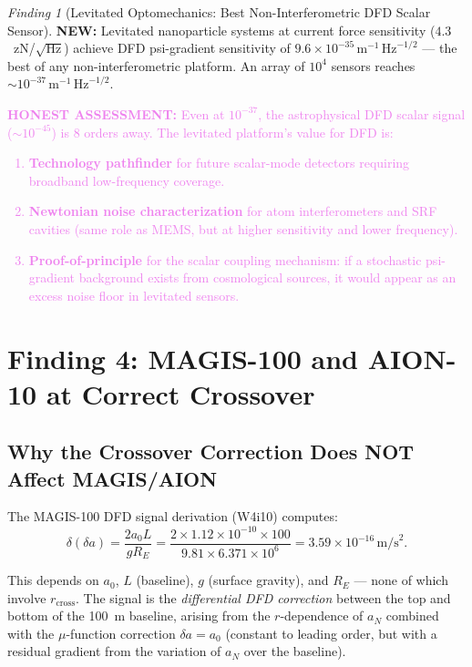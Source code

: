 \documentclass[11pt]{article}
\theoremstyle{definition}
\theoremstyle{remark}
\newtheorem{finding}[theorem]{Finding}
\newcommand{\ee}[1]{\times10^{#1}}
\newcommand{\sqrtHz}{\,\mathrm{Hz}^{-1/2}}
\newcommand{\azero}{a_0}
\newcommand{\honest}[1]{\textcolor{violet}{\textbf{HONEST ASSESSMENT:} #1}}
\newcommand{\newresult}[1]{\textcolor{green!50!black}{\textbf{NEW:} #1}}
\begin{document}
\begin{finding}[Levitated Optomechanics: Best Non-Interferometric
  DFD Scalar Sensor]
\label{find:levitated}
\newresult{Levitated nanoparticle systems at current force sensitivity
($4.3$~zN/$\sqrt{\mathrm{Hz}}$) achieve DFD psi-gradient sensitivity of
$9.6\ee{-35}\,\mathrm{m}^{-1}\sqrtHz$ --- the best of any
non-interferometric platform. An array of $10^4$ sensors reaches
$\sim 10^{-37}\,\mathrm{m}^{-1}\sqrtHz$.}

\honest{Even at $10^{-37}$, the astrophysical DFD scalar signal
($\sim 10^{-45}$) is 8 orders away. The levitated platform's value
for DFD is:
\begin{enumerate}[nosep]
\item \textbf{Technology pathfinder} for future scalar-mode
  detectors requiring broadband low-frequency coverage.
\item \textbf{Newtonian noise characterization} for atom
  interferometers and SRF cavities (same role as MEMS, but
  at higher sensitivity and lower frequency).
\item \textbf{Proof-of-principle} for the scalar coupling
  mechanism: if a stochastic psi-gradient background exists
  from cosmological sources, it would appear as an excess
  noise floor in levitated sensors.
\end{enumerate}}
\end{finding}

\section{Finding 4: MAGIS-100 and AION-10 at Correct Crossover}
\label{sec:magis-aion}

\subsection{Why the Crossover Correction Does NOT Affect MAGIS/AION}

The MAGIS-100 DFD signal derivation (W4i10) computes:
\begin{equation}
\delta(\delta a) = \frac{2\azero L}{g R_E}
= \frac{2 \times 1.12\ee{-10} \times 100}{9.81 \times 6.371\ee{6}}
= 3.59\ee{-16}\,\mathrm{m/s}^2.
\label{eq:magis-signal}
\end{equation}

This depends on $\azero$, $L$ (baseline), $g$ (surface gravity),
and $R_E$ --- none of which involve $r_{\mathrm{cross}}$. The
signal is the \emph{differential DFD correction} between the top
and bottom of the 100~m baseline, arising from the $r$-dependence
of $a_N$ combined with the $\mu$-function correction
$\delta a = \azero$ (constant to leading order, but with a residual
gradient from the variation of $a_N$ over the baseline).
\end{document}
